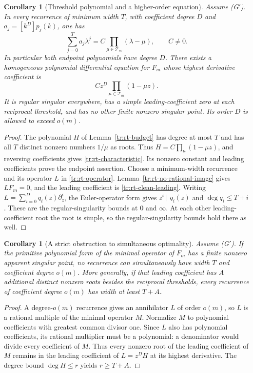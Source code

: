 \documentclass[11pt,a4paper]{article}
\newtheorem{corollary}[theorem]{Corollary}
\theoremstyle{definition}
\theoremstyle{remark}
\numberwithin{equation}{section}
\begin{document}
\begin{corollary}[Threshold polynomial and a higher-order equation]
\label{tr:rt-threshold-polynomial}
Assume \textup{(G$'$)}.  In every recurrence of minimum width $T$,
with coefficient degree $D$ and $a_j=[k^D]p_j(k)$, one has
\begin{equation}
\label{tr:rt-characteristic}
 \sum_{j=0}^T a_j\lambda^j
       =C\prod_{\mu\in\mathcal T_m}(\lambda-\mu),\qquad C\ne0.
\end{equation}
In particular both endpoint polynomials have degree $D$.
There exists a homogeneous polynomial differential equation for
$F_m$ whose highest derivative coefficient is
\begin{equation}
\label{tr:rt-clean-leading}
 C z^D\prod_{\mu\in\mathcal T_m}(1-\mu z).
\end{equation}
It is regular singular everywhere, has a simple leading-coefficient
zero at each reciprocal threshold, and has no other finite nonzero
singular point.  Its order $D$ is allowed to exceed $o(m)$.
\end{corollary}
\begin{proof}
The polynomial $H$ of Lemma~\ref{tr:rt-budget} has degree at most
$T$ and has all $T$ distinct nonzero numbers $1/\mu$ as roots.
Thus $H=C\prod_\mu(1-\mu z)$, and reversing coefficients gives
\eqref{tr:rt-characteristic}.  Its nonzero constant and leading
coefficients prove the endpoint assertion.
Choose a minimum-width recurrence and its operator $L$ in
\eqref{tr:rt-operator}.  Lemma~\ref{tr:rt-no-rational-image} gives $LF_m=0$,
and the leading coefficient is \eqref{tr:rt-clean-leading}.
Writing $L=\sum_{i=0}^D q_i(z)\partial_z^i$, the Euler-operator
form gives $z^i\mid q_i(z)$ and $\deg q_i\le T+i$.
These are the regular-singularity bounds at $0$ and $\infty$.
At each other leading-coefficient root the root is simple, so
the regular-singularity bounds hold there as well.
\end{proof}

\begin{corollary}[A strict obstruction to simultaneous optimality]
\label{tr:rt-tradeoff}
Assume \textup{(G$'$)}. If the primitive polynomial form of the minimal operator of $F_m$
has a finite nonzero apparent singular point, no recurrence can
simultaneously have width $T$ and coefficient degree $o(m)$.
More generally, if that leading coefficient has $A$ additional
distinct nonzero roots besides the reciprocal thresholds, every
recurrence of coefficient degree $o(m)$ has width at least $T+A$.
\end{corollary}
\begin{proof}
A degree-$o(m)$ recurrence gives an annihilator $L$ of order
$o(m)$, so $L$ is a rational multiple of the minimal operator $M$.
Normalize $M$ to polynomial coefficients with greatest common
divisor one.  Since $L$ also has polynomial coefficients, its
rational multiplier must be a polynomial: a denominator would
divide every coefficient of $M$.  Thus every nonzero root of the
leading coefficient of $M$ remains in the leading coefficient of
$L=z^DH$ at its highest derivative.  The degree bound
$\deg H\le r$ yields $r\ge T+A$.
\end{proof}
\end{document}
